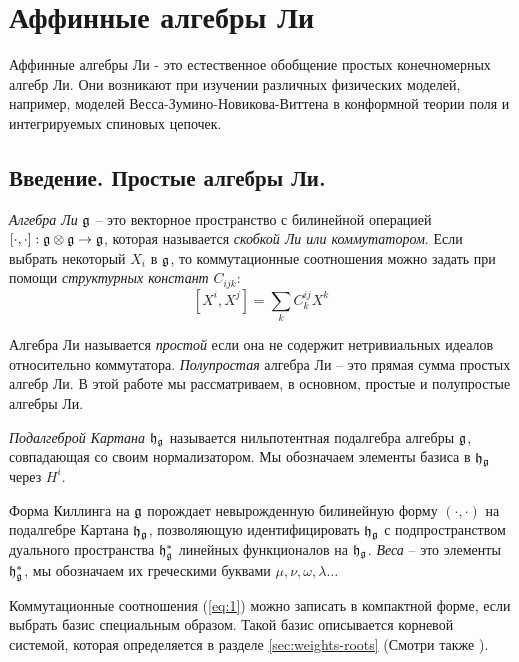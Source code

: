 
\chapter{Аффинные алгебры Ли}
\label{cha:affine-lie-algebras}
Аффинные алгебры Ли - это естественное обобщение простых конечномерных алгебр Ли. Они возникают при изучении различных физических моделей, например, моделей Весса-Зумино-Новикова-Виттена в конформной теории поля и интегрируемых спиновых цепочек. 
\section{Введение. Простые алгебры Ли.}

\label{sec:intro-simple-lie-algebras}

{\it Алгебра Ли} $\mathfrak{g}$ -- это векторное пространство с билинейной операцией $[\cdot,\cdot]:\mathfrak{g}\otimes\mathfrak{g}\to \mathfrak{g}$, которая называется  {\it скобкой Ли или коммутатором}. Если выбрать некоторый  $X_{i}$ в $\mathfrak{g}$, то коммутационные соотношения можно задать при помощи  {\it структурных констант} $C_{ijk}$:
\begin{equation}
  \label{eq:1}
  [X^{i},X^{j}]=\sum_{k} C^{ij}_{k} X^{k}
\end{equation}

Алгебра Ли называется {\it простой} если она не содержит нетривиальных идеалов относительно коммутатора. {\it Полупростая} алгебра Ли -- это прямая сумма простых алгебр Ли. В этой работе мы рассматриваем, в основном, простые и полупростые алгебры Ли.

{\it Подалгеброй Картана}  $\mathfrak{h}_{\mathfrak{g}}$ называется нильпотентная подалгебра алгебры $\mathfrak{g}$, совпадающая со своим нормализатором. Мы обозначаем элементы базиса в $\mathfrak{h}_{\mathfrak{g}}$ через $H^{i}$.

Форма Киллинга на  $\mathfrak{g}$ порождает невырожденную билинейную форму $(\cdot,\cdot)$ на подалгебре Картана $\mathfrak{h}_{\mathfrak{g}}$, позволяющую идентифицировать $\mathfrak{h}_{\mathfrak{g}}$ с подпространством дуального пространства  $\mathfrak{h}_{\mathfrak{g}}^{*}$ линейных функционалов на $\mathfrak{h}_{\mathfrak{g}}$. {\it Веса}  -- это элементы  $\mathfrak{h}_{\mathfrak{g}}^{*}$, мы обозначаем их греческими буквами $\mu,\nu, \omega, \lambda\dots$


Коммутационные соотношения  (\ref{eq:1}) можно записать в компактной форме, если выбрать базис специальным образом. Такой базис описывается корневой системой, которая определяется в разделе \ref{sec:weights-roots} (Смотри также \cite{humphreys1997introduction,humphreys1992reflection}).


